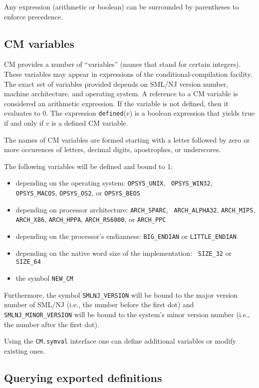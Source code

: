 \documentclass[titlepage,letterpaper]{article}
\begin{document}
Any expression (arithmetic or boolean) can be surrounded by
parentheses to enforce precedence.

\subsection{CM variables}
\label{sec:cmvars}

CM provides a number of ``variables'' (names that stand for certain
integers). These variables may appear in expressions of the
conditional-compilation facility. The exact set of variables provided
depends on SML/NJ version number, machine architecture, and
operating system.  A reference to a CM variable is considered an
arithmetic expression. If the variable is not defined, then it
evaluates to 0.  The expression {\tt defined}($v$) is a boolean
expression that yields true if and only if $v$ is a defined CM
variable.

The names of CM variables are formed starting with a letter followed
by zero or more occurences of letters, decimal digits, apostrophes, or
underscores.

The following variables will be defined and bound to 1:
\begin{itemize}
\item depending on the operating system: {\tt OPSYS\_UNIX}, {\tt
OPSYS\_WIN32}, {\tt OPSYS\_MACOS}, {\tt OPSYS\_OS2}, or \linebreak
{\tt OPSYS\_BEOS}
\item depending on processor architecture: {\tt ARCH\_SPARC}, {\tt
ARCH\_ALPHA32}, {\tt ARCH\_MIPS}, {\tt ARCH\_X86}, {\tt ARCH\_HPPA},
{\tt ARCH\_RS6000}, or {\tt ARCH\_PPC}
\item depending on the processor's endianness: {\tt BIG\_ENDIAN} or
{\tt LITTLE\_ENDIAN}
\item depending on the native word size of the implementation: {\tt
SIZE\_32} or {\tt SIZE\_64}
\item the symbol {\tt NEW\_CM}
\end{itemize}

Furthermore, the symbol {\tt SMLNJ\_VERSION} will be bound to the
major version number of SML/NJ (i.e., the number before the first dot)
and {\tt SMLNJ\_MINOR\_VERSION} will be bound to the system's minor
version number (i.e., the number after the first dot).

Using the {\tt CM.symval} interface one can define additional
variables or modify existing ones.

\subsection{Querying exported definitions}
\end{document}
